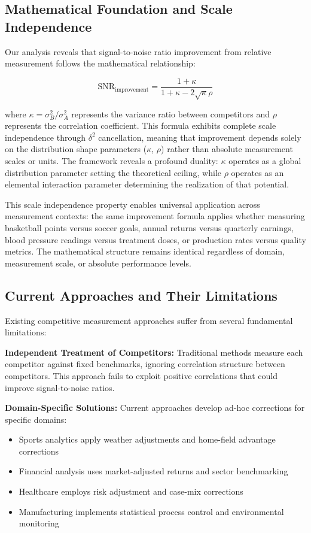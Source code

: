 \subsection{Mathematical Foundation and Scale Independence}

Our analysis reveals that signal-to-noise ratio improvement from relative measurement follows the mathematical relationship:

$$\text{SNR}_{\text{improvement}} = \frac{1 + \kappa}{1 + \kappa - 2\sqrt{\kappa}\rho}$$

where $\kappa = \sigma^2_B/\sigma^2_A$ represents the variance ratio between competitors and $\rho$ represents the correlation coefficient. This formula exhibits complete scale independence through $\delta^2$ cancellation, meaning that improvement depends solely on the distribution shape parameters ($\kappa$, $\rho$) rather than absolute measurement scales or units. The framework reveals a profound duality: $\kappa$ operates as a global distribution parameter setting the theoretical ceiling, while $\rho$ operates as an elemental interaction parameter determining the realization of that potential.

This scale independence property enables universal application across measurement contexts: the same improvement formula applies whether measuring basketball points versus soccer goals, annual returns versus quarterly earnings, blood pressure readings versus treatment doses, or production rates versus quality metrics. The mathematical structure remains identical regardless of domain, measurement scale, or absolute performance levels.

\subsection{Current Approaches and Their Limitations}

Existing competitive measurement approaches suffer from several fundamental limitations:

\textbf{Independent Treatment of Competitors:}
Traditional methods measure each competitor against fixed benchmarks, ignoring correlation structure between competitors. This approach fails to exploit positive correlations that could improve signal-to-noise ratios.

\textbf{Domain-Specific Solutions:}
Current approaches develop ad-hoc corrections for specific domains:
\begin{itemize}
    \item Sports analytics apply weather adjustments and home-field advantage corrections \cite{forrest2000forecasting, boulier2003predicting}
    \item Financial analysis uses market-adjusted returns and sector benchmarking \cite{sharpe1994sharpe}
    \item Healthcare employs risk adjustment and case-mix corrections \cite{hanushek2010generalizations}
    \item Manufacturing implements statistical process control and environmental monitoring
\end{itemize}

